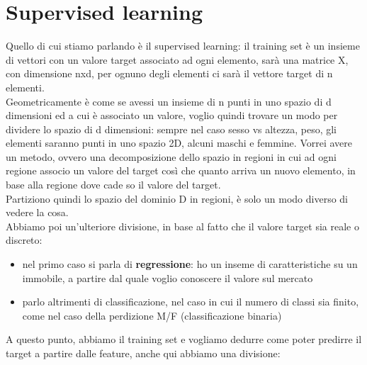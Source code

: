 \documentclass[12pt, oneside]{extbook}
\begin{document}
\section{Supervised learning}
Quello di cui stiamo parlando è il supervised learning: il training set è un insieme di vettori con un valore target associato ad ogni elemento, sarà una matrice X, con dimensione nxd, per ognuno degli elementi ci sarà il vettore target di n elementi.\\Geometricamente è come se avessi un insieme di n punti in uno spazio di d dimensioni ed a cui è associato un valore, voglio quindi trovare un modo per dividere lo spazio di d dimensioni: sempre nel caso sesso vs altezza, peso, gli elementi saranno punti in uno spazio 2D, alcuni maschi e femmine. Vorrei avere un metodo, ovvero una decomposizione dello spazio in regioni in cui ad ogni regione associo un valore del target così che quanto arriva un nuovo elemento, in base alla regione dove cade so il valore del target.\\Partiziono quindi lo spazio del dominio D in regioni, è solo un modo diverso di vedere la cosa.\\Abbiamo poi un'ulteriore divisione, in base al fatto che il valore target sia reale o discreto:
\begin{itemize}
	\item nel primo caso si parla di \textbf{regressione}: ho un inseme di caratteristiche su un immobile, a partire dal quale voglio conoscere il valore sul mercato
	\item parlo altrimenti di classificazione, nel caso in cui il numero di classi sia finito, come nel caso della perdizione M/F (classificazione binaria)
\end{itemize}
A questo punto, abbiamo il training set e vogliamo dedurre come poter predirre il target a partire dalle feature, anche qui abbiamo una divisione:
\end{document}
